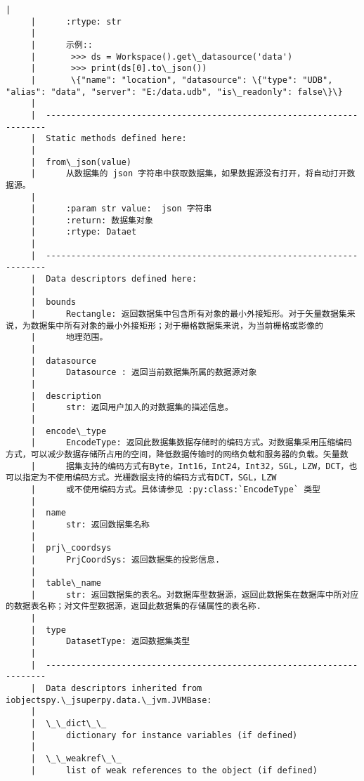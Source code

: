 \documentclass[11pt]{article}
\begin{document}
\begin{Verbatim}[commandchars=\\\{\}]
     |      
     |      :rtype: str
     |      
     |      示例::
     |       >>> ds = Workspace().get\_datasource('data')
     |       >>> print(ds[0].to\_json())
     |       \{"name": "location", "datasource": \{"type": "UDB", "alias": "data", "server": "E:/data.udb", "is\_readonly": false\}\}
     |  
     |  ----------------------------------------------------------------------
     |  Static methods defined here:
     |  
     |  from\_json(value)
     |      从数据集的 json 字符串中获取数据集，如果数据源没有打开，将自动打开数据源。
     |      
     |      :param str value:  json 字符串
     |      :return: 数据集对象
     |      :rtype: Dataet
     |  
     |  ----------------------------------------------------------------------
     |  Data descriptors defined here:
     |  
     |  bounds
     |      Rectangle: 返回数据集中包含所有对象的最小外接矩形。对于矢量数据集来说，为数据集中所有对象的最小外接矩形；对于栅格数据集来说，为当前栅格或影像的
     |      地理范围。
     |  
     |  datasource
     |      Datasource : 返回当前数据集所属的数据源对象
     |  
     |  description
     |      str: 返回用户加入的对数据集的描述信息。
     |  
     |  encode\_type
     |      EncodeType: 返回此数据集数据存储时的编码方式。对数据集采用压缩编码方式，可以减少数据存储所占用的空间，降低数据传输时的网络负载和服务器的负载。矢量数
     |      据集支持的编码方式有Byte，Int16，Int24，Int32，SGL，LZW，DCT，也可以指定为不使用编码方式。光栅数据支持的编码方式有DCT，SGL，LZW
     |      或不使用编码方式。具体请参见 :py:class:`EncodeType` 类型
     |  
     |  name
     |      str: 返回数据集名称
     |  
     |  prj\_coordsys
     |      PrjCoordSys: 返回数据集的投影信息.
     |  
     |  table\_name
     |      str: 返回数据集的表名。对数据库型数据源，返回此数据集在数据库中所对应的数据表名称；对文件型数据源，返回此数据集的存储属性的表名称.
     |  
     |  type
     |      DatasetType: 返回数据集类型
     |  
     |  ----------------------------------------------------------------------
     |  Data descriptors inherited from iobjectspy.\_jsuperpy.data.\_jvm.JVMBase:
     |  
     |  \_\_dict\_\_
     |      dictionary for instance variables (if defined)
     |  
     |  \_\_weakref\_\_
     |      list of weak references to the object (if defined)
    

\end{Verbatim}
\end{document}
